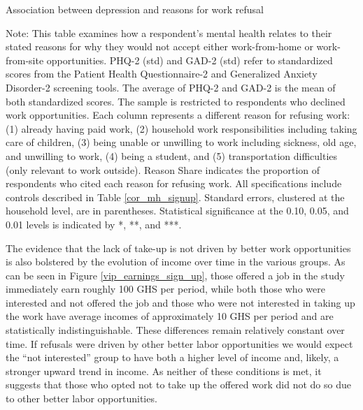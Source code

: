 \documentclass[12pt, a4paper, american]{article}
\begin{document}
\begin{table}\caption{Association between depression and reasons for work refusal}\label{cor_mh_signup_reasons}
\centering
\begin{adjustbox}{width=\textwidth}
\begin{threeparttable}

\begin{tablenotes}
\item Note: This table examines how a respondent's mental health relates to their stated reasons for why they would not accept either work-from-home or work-from-site opportunities. PHQ-2 (std) and GAD-2 (std) refer to standardized scores from the Patient Health Questionnaire-2 and Generalized Anxiety Disorder-2 screening tools. The average of PHQ-2 and GAD-2 is the mean of both standardized scores. The sample is restricted to respondents who declined work opportunities. Each column represents a different reason for refusing work: (1) already having paid work, (2) household work responsibilities including taking care of children, (3) being unable or unwilling to work including sickness, old age, and unwilling to work, (4) being a student, and (5) transportation difficulties (only relevant to work outside). Reason Share indicates the proportion of respondents who cited each reason for refusing work. All specifications include controls described in Table \ref{cor_mh_signup}. Standard errors, clustered at the household level, are in parentheses. Statistical significance at the 0.10, 0.05, and 0.01 levels is indicated by *, **, and ***.
\end{tablenotes}
\end{threeparttable}
\end{adjustbox}
\end{table}

The evidence that the lack of take-up is not driven by better work opportunities is also bolstered by the evolution of income over time in the various groups. As can be seen in Figure \ref{vip_earnings_sign_up}, those offered a job in the study immediately earn roughly 100 GHS per period, while both those who were interested and not offered the job and those who were not interested in taking up the work have average incomes of approximately 10 GHS per period and are statistically indistinguishable. These differences remain relatively constant over time. If refusals were driven by other better labor opportunities we would expect the ``not interested'' group to have both a higher level of income and, likely, a stronger upward trend in income. As neither of these conditions is met, it suggests that those who opted not to take up the offered work did not do so due to other better labor opportunities. 
\end{document}
